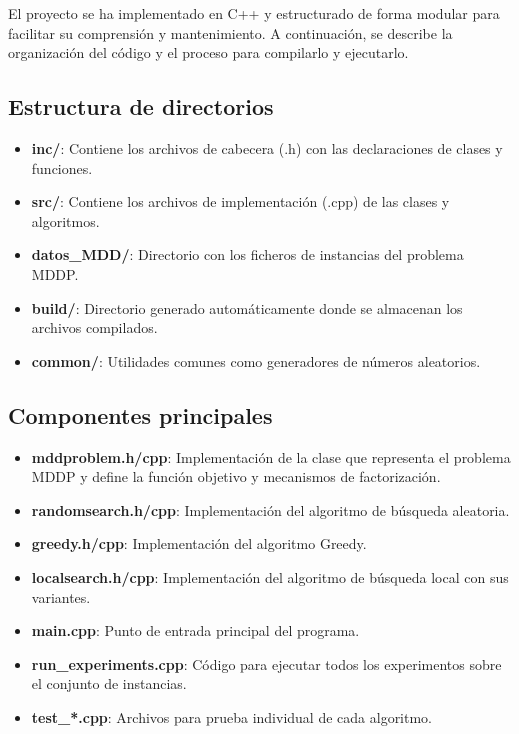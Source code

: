 \documentclass{article}
\begin{document}
El proyecto se ha implementado en C++ y estructurado de forma modular para facilitar su comprensión y mantenimiento. A continuación, se describe la organización del código y el proceso para compilarlo y ejecutarlo.

\subsection{Estructura de directorios}

\begin{itemize}
    \item \textbf{inc/}: Contiene los archivos de cabecera (.h) con las declaraciones de clases y funciones.
    \item \textbf{src/}: Contiene los archivos de implementación (.cpp) de las clases y algoritmos.
    \item \textbf{datos\_MDD/}: Directorio con los ficheros de instancias del problema MDDP.
    \item \textbf{build/}: Directorio generado automáticamente donde se almacenan los archivos compilados.
    \item \textbf{common/}: Utilidades comunes como generadores de números aleatorios.
\end{itemize}

\subsection{Componentes principales}

\begin{itemize}
    \item \textbf{mddproblem.h/cpp}: Implementación de la clase que representa el problema MDDP y define la función objetivo y mecanismos de factorización.
    \item \textbf{randomsearch.h/cpp}: Implementación del algoritmo de búsqueda aleatoria.
    \item \textbf{greedy.h/cpp}: Implementación del algoritmo Greedy.
    \item \textbf{localsearch.h/cpp}: Implementación del algoritmo de búsqueda local con sus variantes.
    \item \textbf{main.cpp}: Punto de entrada principal del programa.
    \item \textbf{run\_experiments.cpp}: Código para ejecutar todos los experimentos sobre el conjunto de instancias.
    \item \textbf{test\_*.cpp}: Archivos para prueba individual de cada algoritmo.
\end{itemize}
\end{document}

